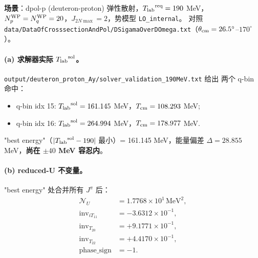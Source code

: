 \begin{numericalbox}[label={box:ch12-numerical-closure}]
\textbf{场景}：dpol-p (deuteron-proton) 弹性散射，\({T_{\text{lab}}}^{\rm req} = 190\) MeV，
\(N_p^{\rm WP} = N_q^{\rm WP} = 20\)，\(J_{2N\max} = 2\)，势模型 \texttt{LO\_internal}。
对照 \texttt{data/DataOfCrosssectionAndPol/DSigamaOverDOmega.txt}（\(\theta_{\rm cm} = 26.5^\circ\)--\(170^\circ\)）。

\paragraph{(a) 求解器实际 \({T_{\text{lab}}}^{\rm sol}\)。}
\texttt{output/deuteron\_proton\_Ay/solver\_validation\_190MeV.txt} 给出
两个 q-bin 命中：
\begin{itemize}
  \item q-bin idx 15: \({T_{\text{lab}}}^{\rm sol} = 161.145\) MeV，\({T_{\text{cm}}} = 108.293\) MeV;
  \item q-bin idx 16: \({T_{\text{lab}}}^{\rm sol} = 264.994\) MeV，\({T_{\text{cm}}} = 178.977\) MeV.
\end{itemize}
"best energy"（\(|{T_{\text{lab}}}^{\rm sol} - 190| \) 最小）= 161.145 MeV，能量偏差
\(\Delta = 28.855\) MeV，\textbf{尚在 \(\pm 40\) MeV 容忍内}。

\paragraph{(b) reduced-U 不变量。}
"best energy" 处合并所有 \(J^\pi\) 后：
\begin{align*}
\mathcal{N}_U     &= 1.7768 \times 10^{1}\,\text{MeV}^2,\\
\mathrm{inv}_{iT_{11}} &= -3.6312 \times 10^{-1},\\
\mathrm{inv}_{T_{20}}  &= +9.1771 \times 10^{-1},\\
\mathrm{inv}_{T_{22}}  &= +4.4170 \times 10^{-1},\\
\text{phase\_sign}     &= -1.
\end{align*}


\end{numericalbox}
